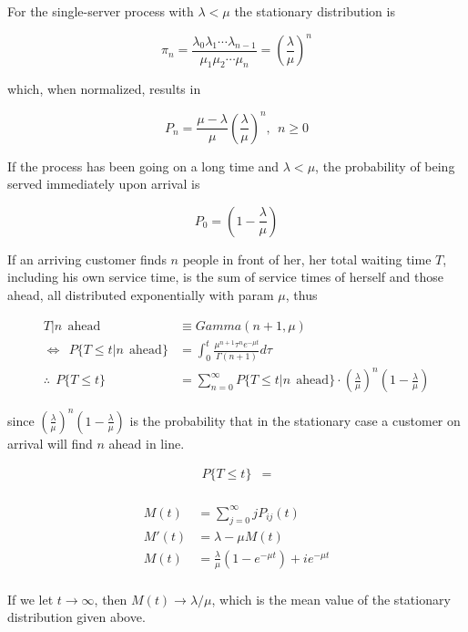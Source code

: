 \documentclass[12pt]{article}
\theoremstyle{nonumberbreak}
\begin{document}
For the single-server process with $\lambda < \mu$ the stationary distribution is 

$$
\pi_n = \frac{\lambda_0 \lambda_1 \cdots \lambda_{n-1} }{\mu_1 \mu_2 \cdots \mu_n} = (\frac{\lambda}{\mu})^n
$$

which, when normalized, results in

$$
P_n = \frac{\mu - \lambda}{\mu} (\frac{\lambda}{\mu})^n, \ \ n \ge 0
$$


If the process has been going on a long time and $\lambda < \mu$, the probability of being served immediately upon arrival is 

$$
P_0 = (1 - \frac{\lambda}{\mu})
$$


If an arriving customer finds $n$ people in front of her, her total waiting time $T$, including his own service time, is the sum of service times of herself and those ahead, all distributed exponentially with param $\mu$, thus 

$$
\begin{aligned}
T | n \ \ \mathrm{ahead} &\equiv Gamma(n+1, \mu) \\[8pt]
\Leftrightarrow \ \ P \{ T \le t | n \ \ \mathrm{ahead}  \} &= \int_0^t \frac{\mu^{n+1} \tau^n e^{-\mu t} }{\Gamma(n+1)} d\tau \\[10pt]
\therefore \ \ P \{ T \le t\} &= \sum_{n=0}^\infty P \{ T \le t | n \ \ \mathrm{ahead} \} \cdot (\frac{\lambda}{\mu})^n (1 - \frac{\lambda}{\mu})
\end{aligned}
$$  

since $(\frac{\lambda}{\mu})^n (1 - \frac{\lambda}{\mu})$ is the probability that in the stationary case a customer on arrival will find $n$ ahead in line. 


$$
\begin{aligned}
P \{ T \le t\} &= \\[8pt]
\end{aligned}
$$



$$
\begin{aligned}
M(t) &= \sum_{j=0}^\infty j P_{ij}(t) \\[8pt]
M'(t) &= \lambda - \mu M(t) \\[8pt]
M(t) &= \frac{\lambda}{\mu} (1 - e^{-\mu t}) + i e^{-\mu t} \\[8pt]
\end{aligned}
$$

If we let $t \to \infty$, then $M(t) \to \lambda/\mu$, which is the mean value of the stationary distribution given above. 
\end{document}
